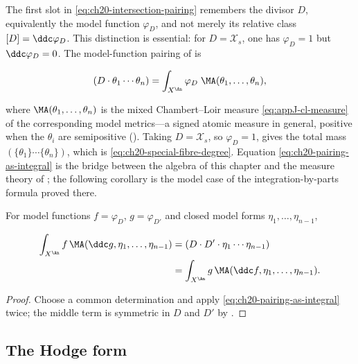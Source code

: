 The first slot in \eqref{eq:ch20-intersection-pairing} remembers the divisor
$D$, equivalently the model function $\varphi_D$, and not merely its
relative class $[D]=\ddc\varphi_D$.  This distinction is essential: for
$D=\mathcal X_s$, one has $\varphi_D=1$ but
$\ddc\varphi_D=0$.  The model-function pairing of
 is

\begin{equation}
\label{eq:ch20-pairing-as-integral}
 (D\cdot\theta_1\cdots\theta_n)
 =\int_{X^{\An}}\varphi_D\;\MA(\theta_1,\ldots,\theta_n),
\end{equation}

where $\MA(\theta_1,\ldots,\theta_n)$ is the mixed Chambert--Loir measure
\eqref{eq:appJ-cl-measure} of the corresponding model metrics---a signed
atomic measure in general, positive when the $\theta_i$ are semipositive
().  Taking $D=\mathcal X_s$, so
$\varphi_D=1$, gives the total mass
$(\{\theta_1\}\cdots\{\theta_n\})$, which is
\eqref{eq:ch20-special-fibre-degree}.  Equation
\eqref{eq:ch20-pairing-as-integral} is the bridge between the algebra of this
chapter and the measure theory of ; the following
corollary is the model case of the integration-by-parts formula
 proved there.

\begin{corollary}
\label{cor:ch20-integration-by-parts}
For model functions $f=\varphi_D$, $g=\varphi_{D'}$ and closed model
forms $\eta_1,\ldots,\eta_{n-1}$,

\begin{equation}
\label{eq:ch20-ibp}
\begin{aligned}
 \int_{X^{\An}}f\,\MA(\ddc g,\eta_1,\ldots,\eta_{n-1})
 &=(D\cdot D'\cdot\eta_1\cdots\eta_{n-1})\\
 &=\int_{X^{\An}}g\,\MA(\ddc f,\eta_1,\ldots,\eta_{n-1}).
\end{aligned}
\end{equation}
\end{corollary}

\begin{proof}
Choose a common determination and apply
\eqref{eq:ch20-pairing-as-integral} twice; the middle term is symmetric in
$D$ and $D'$ by .
\end{proof}

\subsection{The Hodge form}
\label{sec:ch20-hodge}

